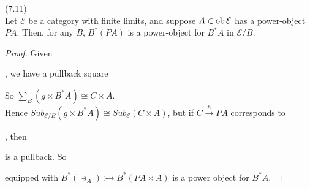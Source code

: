 \documentclass[a4paper]{article}
\begin{document}
\begin{lemma} (7.11)\\
    Let $\mathcal{E}$ be a category with finite limits, and suppose $A \in \operatorname{ob}\mathcal{E}$ has a power-object $PA$. Then, for any $B$, $B^*(PA)$ is a power-object for $B^*A$ in $\mathcal{E}/B$.
    \begin{proof}
        Given 
        , we have a pullback square


        So $\sum_B(g \times B^* A) \cong C \times A$.\\
        Hence $Sub_{\mathcal{E}/B}(g \times B^* A) \cong Sub_{\mathcal{E}}(C \times A)$, but if $C \xrightarrow{h} PA$ corresponds to 
        , then 

        
        is a pullback. So 
        equipped with $B^*(\ni_A) \rightarrowtail B^*(PA\times A)$ is a power object for $B^* A$.
    \end{proof}
\end{lemma} 
\end{document}

